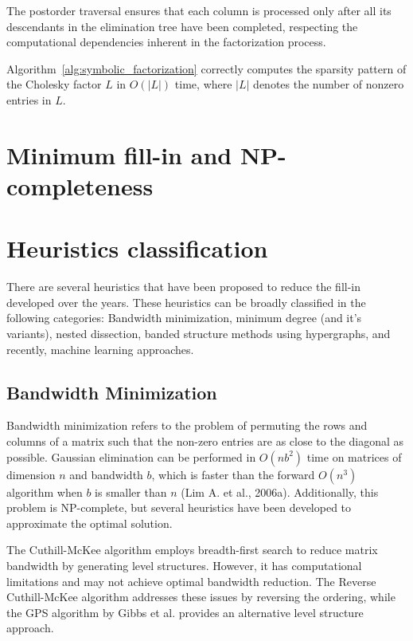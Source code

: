 The postorder traversal ensures that each column is processed only after all its descendants in the elimination tree have been completed, respecting the computational dependencies inherent in the factorization process.

\begin{theorem}
Algorithm~\ref{alg:symbolic_factorization} correctly computes the sparsity pattern of the Cholesky factor $L$ in $O(|L|)$ time, where $|L|$ denotes the number of nonzero entries in $L$.
\end{theorem}


\section{Minimum fill-in and NP-completeness}

\section{Heuristics classification}
\label{sec:heuristics}

There are several heuristics that have been proposed to reduce the fill-in developed over the years. These heuristics can be broadly classified in the following categories: Bandwidth minimization, minimum degree (and it's variants), nested dissection, banded structure methods using hypergraphs, and recently, machine learning approaches. 

\subsection{Bandwidth Minimization}

Bandwidth minimization refers to the problem of permuting the rows and columns of a matrix such that the non-zero entries are as close to the diagonal as possible.  Gaussian elimination can be performed in $O(nb^2)$ time on matrices of dimension $n$ and bandwidth $b$, which is faster than the forward $O(n^3)$ algorithm when $b$ is smaller than $n$ (Lim A. et al., 2006a).  Additionally, this problem is NP-complete, but several heuristics have been developed to approximate the optimal solution.

The Cuthill-McKee algorithm employs breadth-first search to reduce matrix bandwidth by generating level structures. However, it has computational limitations and may not achieve optimal bandwidth reduction. The Reverse Cuthill-McKee algorithm addresses these issues by reversing the ordering, while the GPS algorithm by Gibbs et al. provides an alternative level structure approach.

